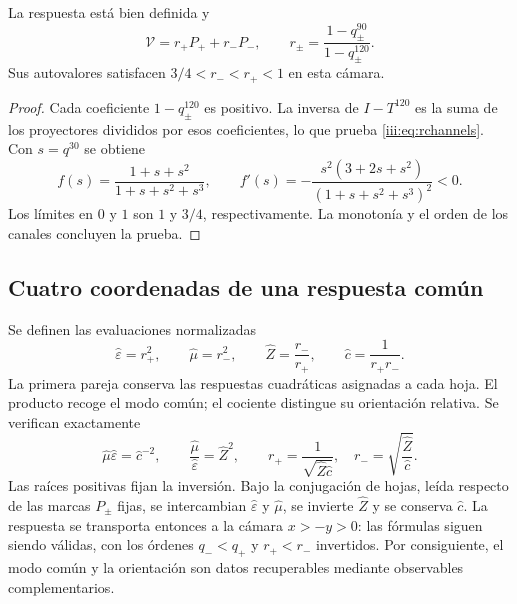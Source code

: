 \begin{proposition}
La respuesta está bien definida y
\begin{equation}
 \mathcal V=r_+P_++r_-P_-,\qquad
 r_\pm=\frac{1-q_\pm^{90}}{1-q_\pm^{120}}.
 \label{iii:eq:rchannels}
\end{equation}
Sus autovalores satisfacen $3/4<r_-<r_+<1$ en esta cámara.
\end{proposition}
\begin{proof}
Cada coeficiente $1-q_\pm^{120}$ es positivo. La inversa de $I-T^{120}$
es la suma de los proyectores divididos por esos coeficientes, lo que prueba
\eqref{iii:eq:rchannels}. Con $s=q^{30}$ se obtiene
\begin{equation}
 f(s)=\frac{1+s+s^2}{1+s+s^2+s^3},\qquad
 f'(s)=-\frac{s^2(3+2s+s^2)}{(1+s+s^2+s^3)^2}<0.
 \label{iii:eq:monotone}
\end{equation}
Los límites en $0$ y $1$ son $1$ y $3/4$, respectivamente. La monotonía
y el orden de los canales concluyen la prueba.
\end{proof}

\subsection{Cuatro coordenadas de una respuesta común}

Se definen las evaluaciones normalizadas
\begin{equation}
 \widehat\varepsilon=r_+^2,\qquad
 \widehat\mu=r_-^2,\qquad
 \widehat Z=\frac{r_-}{r_+},\qquad
 \widehat c=\frac1{r_+r_-}.
 \label{iii:eq:four}
\end{equation}
La primera pareja conserva las respuestas cuadráticas asignadas a cada hoja.
El producto recoge el modo común; el cociente distingue su orientación relativa.
Se verifican exactamente
\begin{equation}
 \widehat\mu\widehat\varepsilon=\widehat c^{-2},\qquad
 \frac{\widehat\mu}{\widehat\varepsilon}=\widehat Z^2,
 \qquad
 r_+=\frac1{\sqrt{\widehat Z\widehat c}},\quad
 r_-=\sqrt{\frac{\widehat Z}{\widehat c}}.
 \label{iii:eq:four-identities}
\end{equation}
Las raíces positivas fijan la inversión. Bajo la conjugación de hojas,
leída respecto de las marcas $P_\pm$ fijas, se
intercambian $\widehat\varepsilon$ y $\widehat\mu$, se invierte
$\widehat Z$ y se conserva $\widehat c$. La respuesta se transporta entonces
a la cámara $x>-y>0$: las fórmulas siguen siendo válidas, con los órdenes
$q_-<q_+$ y $r_+<r_-$ invertidos. Por consiguiente, el modo común
y la orientación son datos recuperables mediante observables complementarios.

